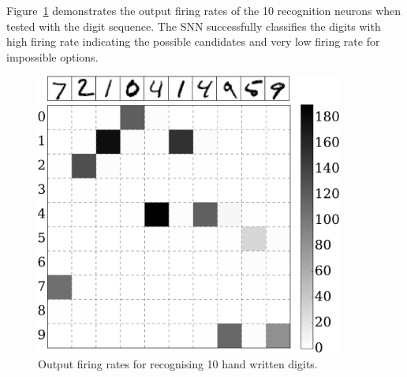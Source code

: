 	Figure~\ref{Fig:out} demonstrates the output firing rates of the 10 recognition neurons when tested with the digit sequence.
	The SNN successfully classifies the digits with high firing rate indicating the possible candidates and very low firing rate for impossible options. 
		\begin{figure}[tbp!]
			\centering
			\includegraphics[width=0.9\textwidth]{pics_iconip/7.pdf}
			\caption{Output firing rates for recognising 10 hand written digits.}
			\label{Fig:out}
		\end{figure}
	
